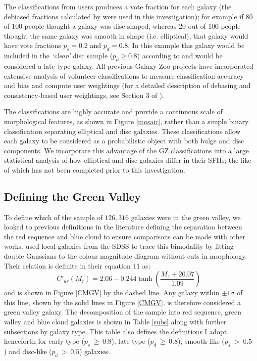 \documentclass[useAMS,usenatbib]{mn2e}
\def\changed    {\color{titlecol} }
\begin{document}
The classifications from users produces a vote fraction for each galaxy (the debiased fractions calculated by \citet{GZ2} were used in this investigation); for example if 80 of 100 people thought a galaxy was disc shaped, whereas 20 out of 100 people thought the same galaxy was smooth in shape (i.e. elliptical), that galaxy would have vote fractions $p_{s} = 0.2$ and $p_{d} = 0.8$. In this example this galaxy would be included in the \emph{`clean'} disc sample ($p_d \geq 0.8$) according to \cite{GZ2} and would be considered a late-type galaxy. {\changed All previous Galaxy Zoo projects have incorporated extensive analysis of volunteer classifications to measure classification accuracy and bias and compute user weightings (for a detailed description of debasing and consistency-based user weightings, see Section 3 of \citealt{GZ2}). }

{\changed The classifications are highly accurate and provide a continuous scale of morphological features, as shown in Figure \ref{mosaic}, rather than a simple binary classification separating elliptical and disc galaxies. These classifications allow each galaxy to be considered as a probabilistic object with both bulge and disc components.} We incorporate this advantage of the GZ classifications into a large statistical analysis of how elliptical and disc galaxies differ in their SFHs; the like of which has not been completed prior to this investigation.

\subsection{Defining the Green Valley}\label{defGV}

To define which of the sample of $126, 316$ galaxies were in the green valley, {\changed we looked to previous definitions in the literature defining the separation between the red sequence and blue cloud to ensure comparisons can be made with other works. \citet{Baldry04} used local galaxies from the SDSS to trace this bimodality by fitting double Gaussians to the colour magnitude diagram without cuts in morphology.} Their relation is definite in their equation 11 as:
\begin{equation}
C'_{ur}(M_{r}) = 2.06 - 0.244 \tanh \left( \frac{M_r + 20.07}{1.09}\right)
\end{equation}
and is shown in Figure \ref{CMGV} by the dashed line. Any galaxy within $\pm 1\sigma$ of this line, shown by the solid lines in Figure \ref{CMGV}, is therefore considered a green valley galaxy. The decomposition of the sample into red sequence, green valley and blue cloud galaxies is shown in Table \ref{subs} along with further subsections by galaxy type. This table also defines the definitions I adopt henceforth for early-type ($p_s~ \geq~0.8$), late-type ($p_d~ \geq~0.8$), smooth-like ($p_s~ >~0.5$) and disc-like ($p_d~ >~0.5$) galaxies.
\end{document}
